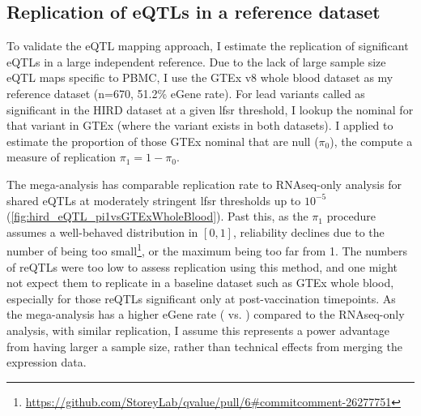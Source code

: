 \subsection{Replication of eQTLs in a reference dataset}

To validate the \gls{eQTL} mapping approach, I estimate the replication of significant eQTLs in a large independent reference.
Due to the lack of large sample size \gls{eQTL} maps specific to \gls{PBMC}, I use the GTEx v8 whole blood dataset as my reference dataset (n=670, 51.2\% eGene rate).
For lead variants called as significant in the \gls{HIRD} dataset at a given lfsr threshold, I lookup the nominal \pvalue{} for that variant in GTEx (where the variant exists in both datasets).
I applied  to estimate the proportion of those GTEx nominal \pvalues{} that are null ($\pi_0$), the compute a measure of replication $\pi_1 = 1 - \pi_0$.

The mega-analysis has comparable replication rate to \gls{RNAseq}-only analysis for shared \glspl{eQTL} at moderately stringent \gls{lfsr} thresholds up to $10^{-5}$ (\autoref{fig:hird_eQTL_pi1vsGTExWholeBlood}).
Past this, as the $\pi_1$ procedure assumes a well-behaved \pvalue distribution in $\left[0, 1\right]$, 
reliability declines due to the number of \pvalues{} being too small\footnote{\url{https://github.com/StoreyLab/qvalue/pull/6\#commitcomment-26277751}}, or the maximum \pvalue{} being too far from 1.
The numbers of \glspl{reQTL} were too low to assess replication using this method, and one might not expect them to replicate in a baseline dataset such as GTEx whole blood, especially for those \glspl{reQTL} significant only at post-vaccination timepoints.
As the mega-analysis has a higher eGene rate ( vs. ) compared to the \gls{RNAseq}-only analysis, with similar replication,
I assume this represents a power advantage from having larger a sample size, rather than technical effects from merging the expression data.

